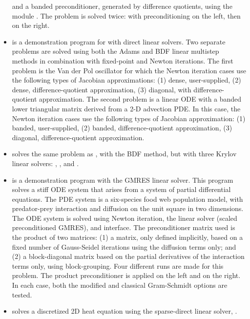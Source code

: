 \begin{itemize}
  and a banded preconditioner, generated by difference quotients,
  using the module {\cvbandpre}.
  \newline
  The problem is solved twice: with preconditioning on the left,
  then on the right.
\item {}
  is a demonstration program for {\cvode} with direct linear solvers.
  \newline
  Two separate problems are solved using both the Adams and BDF linear
  multistep methods in combination with fixed-point and Newton
  iterations.
  \newline
  The first problem is the Van der Pol oscillator for which
  the Newton iteration cases use the following types of Jacobian approximations:
  (1) dense, user-supplied, (2) dense, difference-quotient approximation,
  (3) diagonal, with difference-quotient approximation. The second
  problem is a linear ODE with a
  banded lower triangular matrix derived from a 2-D advection PDE. In this
  case, the Newton iteration cases use the following types of Jacobian
  approximation: (1) banded, user-supplied, (2) banded, difference-quotient
  approximation, (3) diagonal, difference-quotient approximation.
\item {}
  solves the same problem as , with the BDF method, but with
  three Krylov linear solvers: {\sunlinsolspgmr}, {\sunlinsolspbcgs},
  and {\sunlinsolsptfqmr}.
\item {}
  is a demonstration program with the GMRES linear solver.
  \newline
  This program solves a stiff ODE system that arises from a system
  of partial differential equations.  The PDE system is a six-species
  food web population model, with predator-prey interaction and diffusion
  on the unit square in two dimensions.
  \newline
  The ODE system is solved using Newton iteration, the
  {\sunlinsolspgmr} linear solver (scaled preconditioned GMRES), and
  {\cvls} interface.
  \newline
  The preconditioner matrix used is the product of two matrices:
  (1) a matrix, only defined implicitly, based on a fixed number of
  Gauss-Seidel iterations using the diffusion terms only; and
  (2) a block-diagonal matrix based on the partial derivatives of the
  interaction terms only, using block-grouping.
  \newline
  Four different runs are made for this problem.
  The product preconditioner is applied on the left and on the right.
  In each case, both the modified and classical Gram-Schmidt options
  are tested.
\item {} solves a discretized 2D heat equation using
  the {\klu} sparse-direct linear solver, {\sunlinsolklu}.
\end{itemize}

